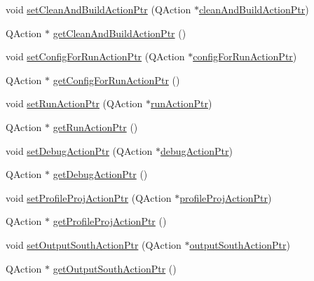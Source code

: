\begin{DoxyCompactItemize}
\item 
void \hyperlink{class_master_actions_a9ed58e080af95465715e9be1c9ee71c6}{set\-Clean\-And\-Build\-Action\-Ptr} (Q\-Action $\ast$\hyperlink{class_master_actions_a2c0f332975bec2424d4af212ab566c5a}{clean\-And\-Build\-Action\-Ptr})
\item 
Q\-Action $\ast$ \hyperlink{class_master_actions_af23ec377bb3603963735d30876e6147e}{get\-Clean\-And\-Build\-Action\-Ptr} ()
\item 
void \hyperlink{class_master_actions_a8b4ef0d552c3dac5c81cf65502650ae5}{set\-Config\-For\-Run\-Action\-Ptr} (Q\-Action $\ast$\hyperlink{class_master_actions_acd6548d1110ae426f384bfeb6acc9c1f}{config\-For\-Run\-Action\-Ptr})
\item 
Q\-Action $\ast$ \hyperlink{class_master_actions_a5266af068fe6ec921cca9e84b9ad7c13}{get\-Config\-For\-Run\-Action\-Ptr} ()
\item 
void \hyperlink{class_master_actions_a28ac730c1a6dd78adf10e1ffcda14aaa}{set\-Run\-Action\-Ptr} (Q\-Action $\ast$\hyperlink{class_master_actions_a3377fe0ddc45ce50119766c8a903c039}{run\-Action\-Ptr})
\item 
Q\-Action $\ast$ \hyperlink{class_master_actions_a99017fd6ad87557fb0dbbf60ced23a23}{get\-Run\-Action\-Ptr} ()
\item 
void \hyperlink{class_master_actions_a66be4fac5aa53c8c40128e1cfab35676}{set\-Debug\-Action\-Ptr} (Q\-Action $\ast$\hyperlink{class_master_actions_ae37993bbbed4a238ea3b11089ac46a61}{debug\-Action\-Ptr})
\item 
Q\-Action $\ast$ \hyperlink{class_master_actions_a38c19285a782f80fd538243f1a7119bc}{get\-Debug\-Action\-Ptr} ()
\item 
void \hyperlink{class_master_actions_a9e65ed1866abe772a8d26fbcaad1f69c}{set\-Profile\-Proj\-Action\-Ptr} (Q\-Action $\ast$\hyperlink{class_master_actions_a5242e5fa69f4d15c15a32b43f227e397}{profile\-Proj\-Action\-Ptr})
\item 
Q\-Action $\ast$ \hyperlink{class_master_actions_ac14ba2c15188efd85f5dd52fcbe138fc}{get\-Profile\-Proj\-Action\-Ptr} ()
\item 
void \hyperlink{class_master_actions_ac476afca80285f13a11ef0e5cd10778c}{set\-Output\-South\-Action\-Ptr} (Q\-Action $\ast$\hyperlink{class_master_actions_a5b7a85c6728274eb0fcb48924044b9f6}{output\-South\-Action\-Ptr})
\item 
Q\-Action $\ast$ \hyperlink{class_master_actions_acb9a1d3eb98cab06fd2ae5b9faf30fc3}{get\-Output\-South\-Action\-Ptr} ()
\item 

\end{DoxyCompactItemize}
